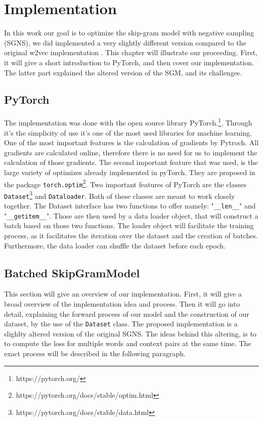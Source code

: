 \chapter{Implementation}\label{chap:implementation}

In this work our goal is to optimize the skip-gram model with negative sampling (SGNS), we did implemented a very slightly different version compared to the original w2vec implementation \cite{mikolov}.
This chapter will illustrate our proceeding. First, it will give a short introduction to PyTorch, and then cover our implementation. The latter part explained the altered version of the SGM, and its challenges.
\section{PyTorch}
The implementation was done with the open source library PyTorch.\footnote{https://pytorch.org/}. Through it's the simplicity of use it's one of the most used libraries for machine learning. One of the most important features is the calculation of gradients by Pytroch. All gradients are calculated online, therefore there is no need for us to implement the calculation of those gradients. The second important feature that was used, is the large variety of optimizes already implemented in pyTorch. They are proposed in the package \texttt{torch.optim}\footnote{https://pytorch.org/docs/stable/optim.html}. Two important features of PyTorch are the classes \texttt{Dataset}\footnote{\label{note_data}https://pytorch.org/docs/stable/data.html} and \texttt{Dataloader}\footnotemark[\ref{note_data}]. Both of these classes are meant to work closely together.   The Dataset interface has two functions to offer namely: "\texttt{\_\_len\_\_}" and "\texttt{\_\_getitem\_\_}". Those are then used by a data loader object, that will construct a batch based on those two functions. The loader object will facilitate the training process, as it facilitates the iteration over the dataset and the creation of batches. Furthermore, the data loader can shuffle the dataset before each epoch. 

\section{Batched SkipGramModel} \label{ssec:b_SGM}
This section will give an overview of our implementation. First, it will give a broad overview of the implementation idea and process. Then it will go into detail, explaining the forward process of our model and the construction of our dataset, by the use of the \texttt{Dataset} class. The proposed implementation is a slighlty altered version of the original SGNS. The ideas behind this altering, is to to compute the loss for multiple words and context pairs at the same time. The exact process will be described in the following paragraph. 
